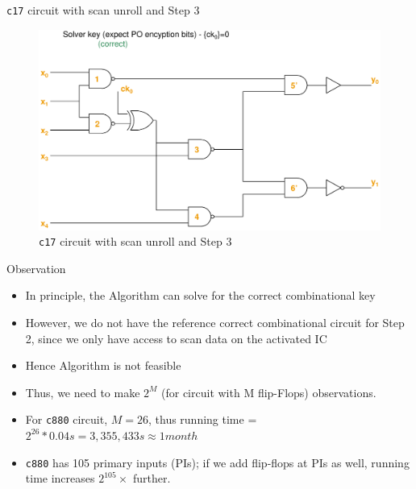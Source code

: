 \begin{frame}{\texttt{c17} circuit with scan unroll and Step 3}
       \begin{figure}
                \begin{center}
                \label{fig:c17-s-l-Algo-Step2}
                \caption{\texttt{c17} circuit with scan unroll and Step 3}
                        \includegraphics[scale=0.3]{fig/c17_sequentially_locked_scan_unrolled_Algo_Step3.pdf}
                \end{center}
        \end{figure}
\end{frame}

\begin{frame}{Observation}
\begin{itemize}
\item In principle, the Algorithm can solve for the correct combinational key
\item However, we do not have the reference correct combinational circuit for Step 2, since we only have access to scan data on the activated IC
\item Hence Algorithm is not feasible
\item Thus, we need to make $2^M$ (for circuit with M flip-Flops) observations. 
\item For \texttt{c880} circuit, $M=26$, thus running time = $2^{26}*0.04s = 3, 355, 433 s  \approx 1 month $
\item \texttt{c880} has 105 primary inputs (PIs); if we add flip-flops at PIs as well, running time increases $2^{105}\times$ further. 
\end{itemize}
\end{frame}


